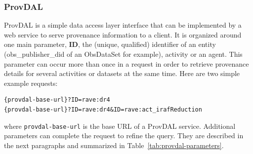 \subsubsection{ProvDAL}
ProvDAL is a simple data access layer interface \citep[see DALI specification of the VO, ][]{std:DALI} that can be implemented by a web service to serve provenance information to a client.
It is organized around one main parameter, {\bf ID}, the (unique, qualified) identifier of an entity (obs\_publisher\_did of an ObsDataSet for example), activity or an agent. This parameter can occur more than once in a request in order to retrieve provenance details for several activities or datasets at the same time. Here are two simple example requests:

\begin{verbatim}
{provdal-base-url}?ID=rave:dr4
{provdal-base-url}?ID=rave:dr4&ID=rave:act_irafReduction
\end{verbatim}
\noindent
where \texttt{provdal-base-url} is the base URL of a ProvDAL service. Additional parameters can complete the request to refine the query. They are described in the next paragraphs and summarized in Table~\ref{tab:provdal-parameters}.

